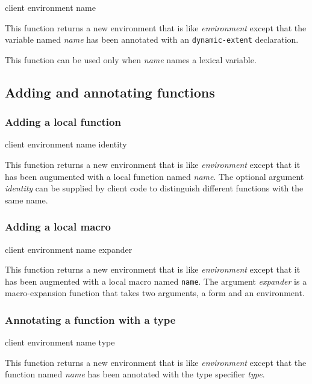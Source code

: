 {\footnotesize
{} {client environment name}
}

This function returns a new environment that is like
\textit{environment} except that the variable named \textit{name} has
been annotated with an \texttt{dynamic-extent} declaration.

This function can be used only when \textit{name} names a lexical variable.

\subsection{Adding and annotating functions}

\subsubsection{Adding a local function}

{\footnotesize
{} {client environment name \optional identity}
}

This function returns a new environment that is like
\textit{environment} except that it has been augumented with a local
function named \textit{name}.  The optional argument \textit{identity}
can be supplied by client code to distinguish different functions with
the same name.

\subsubsection{Adding a local macro}

{\footnotesize
{} {client environment name expander}
}

This function returns a new environment that is like
\textit{environment} except that it has been augmented with a local
macro named \texttt{name}.  The argument \textit{expander} is a
macro-expansion function that takes two arguments, a form and an
environment.

\subsubsection{Annotating a function with a type}
\label{sec-annotating-a-function-with-a-type}

{\footnotesize
{} {client environment name type}
}

This function returns a new environment that is like
\textit{environment} except that the function named \textit{name} has
been annotated with the type specifier \textit{type}.


